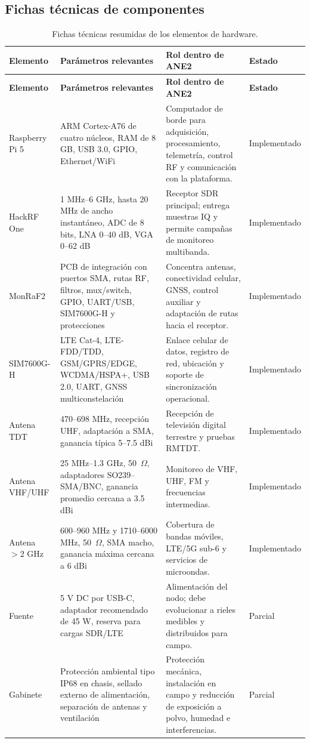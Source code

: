 \subsection{Fichas técnicas de componentes}

\scriptsize
\setlength{\tabcolsep}{3pt}
\begin{longtable}{@{}p{2.4cm} p{3.5cm} p{5.2cm} p{1.7cm}@{}}
\caption{Fichas técnicas resumidas de los elementos de hardware.}
\label{tab:hw_fichas}\\
\toprule
\textbf{Elemento} & \textbf{Parámetros relevantes} & \textbf{Rol dentro de ANE2} & \textbf{Estado} \\
\midrule
\endfirsthead
\toprule
\textbf{Elemento} & \textbf{Parámetros relevantes} & \textbf{Rol dentro de ANE2} & \textbf{Estado} \\
\midrule
\endhead
Raspberry Pi 5 & ARM Cortex-A76 de cuatro núcleos, RAM de 8 GB, USB 3.0, GPIO, Ethernet/WiFi & Computador de borde para adquisición, procesamiento, telemetría, control RF y comunicación con la plataforma. & Implementado \\
HackRF One & 1 MHz--6 GHz, hasta 20 MHz de ancho instantáneo, ADC de 8 bits, LNA 0--40 dB, VGA 0--62 dB & Receptor SDR principal; entrega muestras IQ y permite campañas de monitoreo multibanda. & Implementado \\
MonRaF2 & PCB de integración con puertos SMA, rutas RF, filtros, mux/switch, GPIO, UART/USB, SIM7600G-H y protecciones & Concentra antenas, conectividad celular, GNSS, control auxiliar y adaptación de rutas hacia el receptor. & Implementado \\
SIM7600G-H & LTE Cat-4, LTE-FDD/TDD, GSM/GPRS/EDGE, WCDMA/HSPA+, USB 2.0, UART, GNSS multiconstelación & Enlace celular de datos, registro de red, ubicación y soporte de sincronización operacional. & Implementado \\
Antena TDT & 470--698 MHz, recepción UHF, adaptación a SMA, ganancia típica 5--7.5 dBi & Recepción de televisión digital terrestre y pruebas RMTDT. & Implementado \\
Antena VHF/UHF & 25 MHz--1.3 GHz, 50~$\Omega$, adaptadores SO239--SMA/BNC, ganancia promedio cercana a 3.5 dBi & Monitoreo de VHF, UHF, FM y frecuencias intermedias. & Implementado \\
Antena $>2$ GHz & 600--960 MHz y 1710--6000 MHz, 50~$\Omega$, SMA macho, ganancia máxima cercana a 6 dBi & Cobertura de bandas móviles, LTE/5G sub-6 y servicios de microondas. & Implementado \\
Fuente & 5 V DC por USB-C, adaptador recomendado de 45 W, reserva para cargas SDR/LTE & Alimentación del nodo; debe evolucionar a rieles medibles y distribuidos para campo. & Parcial \\
Gabinete & Protección ambiental tipo IP68 en chasis, sellado externo de alimentación, separación de antenas y ventilación & Protección mecánica, instalación en campo y reducción de exposición a polvo, humedad e interferencias. & Parcial \\
\bottomrule
\end{longtable}
\setlength{\tabcolsep}{6pt}
\normalsize

